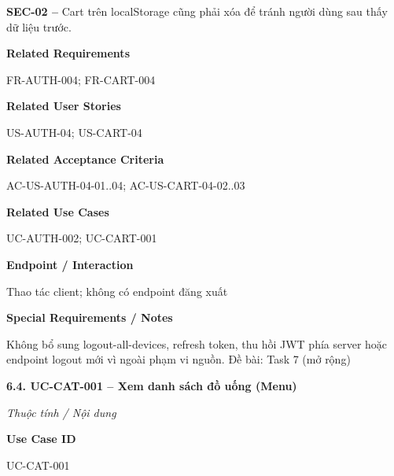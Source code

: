 \documentclass[11pt,a4paper,oneside]{report}
\begin{document}
\textbf{SEC-02 --} Cart trên localStorage cũng phải xóa để tránh người dùng sau thấy dữ liệu trước.
\par

\par\smallskip\noindent\textcolor{sgublue}{\textbf{Related Requirements}}\par\nobreak
FR-AUTH-004; FR-CART-004
\par

\par\smallskip\noindent\textcolor{sgublue}{\textbf{Related User Stories}}\par\nobreak
US-AUTH-04; US-CART-04
\par

\par\smallskip\noindent\textcolor{sgublue}{\textbf{Related Acceptance Criteria}}\par\nobreak
AC-US-AUTH-04-01..04; AC-US-CART-04-02..03
\par

\par\smallskip\noindent\textcolor{sgublue}{\textbf{Related Use Cases}}\par\nobreak
UC-AUTH-002; UC-CART-001
\par

\par\smallskip\noindent\textcolor{sgublue}{\textbf{Endpoint / Interaction}}\par\nobreak
Thao tác client; không có endpoint đăng xuất
\par

\par\smallskip\noindent\textcolor{sgublue}{\textbf{Special Requirements / Notes}}\par\nobreak
Không bổ sung logout-all-devices, refresh token, thu hồi JWT phía server hoặc endpoint logout mới vì ngoài phạm vi nguồn. \textbar{} Đề bài: Task 7 (mở rộng)
\par



\textbf{6.4. UC-CAT-001 -- Xem danh sách đồ uống (Menu)}



\par\noindent\textit{Thuộc tính / Nội dung}\par

\par\smallskip\noindent\textcolor{sgublue}{\textbf{Use Case ID}}\par\nobreak
UC-CAT-001
\par
\end{document}

